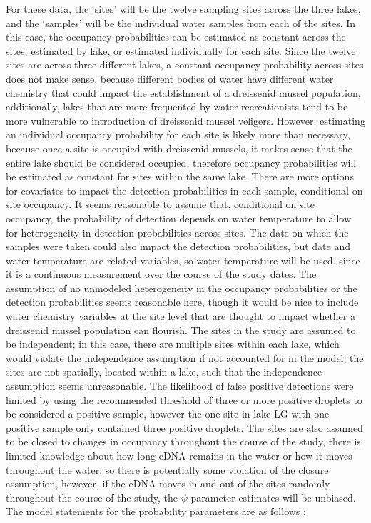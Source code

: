 \documentclass[12pt]{article}\usepackage[]{graphicx}\usepackage[]{color}
\begin{document}
For these data, the `sites' will be the twelve sampling sites across the three lakes, and the `samples' will be the individual water samples from each of the sites. In this case, the occupancy probabilities can be estimated as constant across the sites, estimated by lake, or estimated individually for each site. Since the twelve sites are across three different lakes, a constant occupancy probability across sites does not make sense, because different bodies of water have different water chemistry that could impact the establishment of a dreissenid mussel population, additionally, lakes that are more frequented by water recreationists tend to be more vulnerable to introduction of dreissenid mussel veligers. However, estimating an individual occupancy probability for each site is likely more than necessary, because once a site is occupied with dreissenid mussels, it makes sense that the entire lake should be considered occupied, therefore occupancy probabilities will be estimated as constant for sites within the same lake. There are more options for covariates to impact the detection probabilities in each sample, conditional on site occupancy. It seems reasonable to assume that, conditional on site occupancy, the probability of detection depends on water temperature to allow for heterogeneity in detection probabilities across sites. The date on which the samples were taken could also impact the detection probabilities, but date and water temperature are related variables, so water temperature will be used, since it is a continuous measurement over the course of the study dates. The assumption of no unmodeled heterogeneity in the occupancy probabilities or the detection probabilities seems reasonable here, though it would be nice to include water chemistry variables at the site level that are thought to impact whether a dreissenid mussel population can flourish. The sites in the study are assumed to be independent; in this case, there are multiple sites within each lake, which would violate the independence assumption if not accounted for in the model; the sites are not spatially, located within a lake, such that the independence assumption seems unreasonable. The likelihood of false positive detections were limited by using the recommended threshold of three or more positive droplets to be considered a positive sample, however the one site in lake LG with one positive sample only contained three positive droplets. The sites are also assumed to be closed to changes in occupancy throughout the course of the study, there is limited knowledge about how long eDNA remains in the water or how it moves throughout the water, so there is potentially some violation of the closure assumption, however, if the eDNA moves in and out of the sites randomly throughout the course of the study, the $\psi$ parameter estimates will be unbiased. The model statements for the probability parameters are as follows :  
\end{document}
